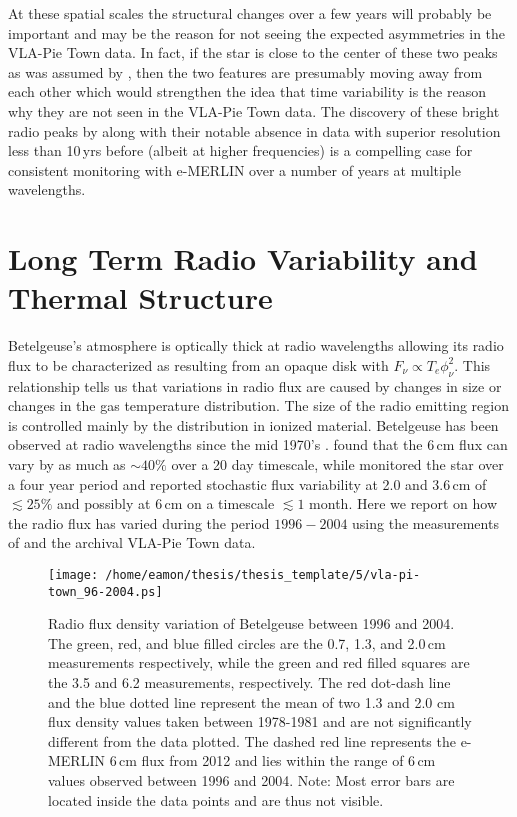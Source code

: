 At these spatial scales the structural changes over a few years will probably be important and may be the reason for not seeing the expected asymmetries in the VLA-Pie Town data. In fact, if the star is close to the center of these two peaks as was assumed by \cite{richards_2013}, then the two features are presumably moving away from each other which would strengthen the idea that time variability is the reason why they are not seen in the VLA-Pie Town data. The discovery of these bright radio peaks by \cite{richards_2013} along with their notable absence in data with superior resolution less than 10\,yrs before (albeit at higher frequencies) is a compelling case for consistent monitoring with e-MERLIN over a number of years at multiple wavelengths.

\section{Long Term Radio Variability and Thermal Structure}\label{sec:5.14}
Betelgeuse's atmosphere is optically thick at radio wavelengths allowing its radio flux to be characterized as resulting from an opaque disk with $F_{\nu} \propto T_{e}\phi _{\nu}^2$. This relationship tells us that variations in radio flux are caused by changes in size or changes in the gas temperature distribution. The size of the radio emitting region is controlled mainly by the distribution in ionized material. Betelgeuse has been observed at radio wavelengths since the mid 1970's \cite[e.g.][]{newell_1982}. \cite{bookbinder_1987} found that the 6\,cm flux can vary by as much as $\sim 40\%$ over a 20 day timescale, while \cite{drake_1992} monitored the star over a four year period and reported stochastic flux variability at 2.0 and 3.6\,cm of $\lesssim 25\%$ and possibly at 6\,cm on a timescale $\lesssim 1$ month. Here we report on how the radio flux has varied during the period $1996-2004$ using the measurements of \cite{lim_1998} and the archival VLA-Pie Town data.

\begin{figure}[hbt!]
\centering
          \texttt{[image: /home/eamon/thesis/thesis\_template/5/vla-pi-town\_96-2004.ps]}
\caption[Radio flux density variation of Betelgeuse between $1996\rightarrow 2004$]{Radio flux density variation of Betelgeuse between 1996 and 2004. The green, red, and blue filled circles are the 0.7, 1.3, and 2.0\,cm measurements respectively, while the green and red filled squares are the 3.5 and 6.2 measurements, respectively. The red dot-dash line and the blue dotted line represent the mean of two 1.3 and 2.0 cm flux density values taken between 1978-1981 and are not significantly different from the data plotted. The dashed red line represents the e-MERLIN 6\,cm flux from 2012 and lies within the range of 6\,cm values observed between 1996 and 2004. Note: Most error bars are located inside the data points and are thus not visible.}
\label{fig:5.16}
\end{figure}

